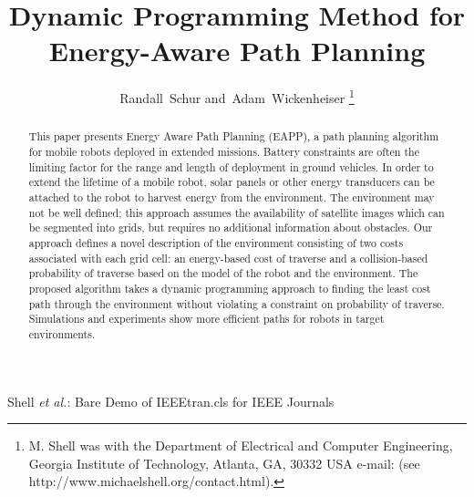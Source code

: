 \documentclass[journal]{IEEEtran}
\begin{document}
\title{Dynamic Programming Method for Energy-Aware Path Planning}

%

\author{Randall~Schur
        and~Adam~Wickenheiser
\thanks{M. Shell was with the Department
of Electrical and Computer Engineering, Georgia Institute of Technology, Atlanta,
GA, 30332 USA e-mail: (see http://www.michaelshell.org/contact.html).}%
}

%
{Shell \MakeLowercase{\textit{et al.}}: Bare Demo of IEEEtran.cls for IEEE Journals}

\maketitle

\begin{abstract}
This paper presents Energy Aware Path Planning (EAPP), a path planning algorithm for mobile robots deployed in extended missions. Battery constraints are often the limiting factor for the range and length of deployment in ground vehicles. In order to extend the lifetime of a mobile robot, solar panels or other energy transducers can be attached to the robot to harvest energy from the environment. The environment may not be well defined; this approach assumes the availability of satellite images which can be segmented into grids, but requires no additional information about obstacles. Our approach defines a novel description of the environment consisting of two costs associated with each grid cell: an energy-based cost of traverse and a collision-based probability of traverse based on the model of the robot and the environment. The proposed algorithm takes a dynamic programming approach to finding the least cost path through the environment without violating a constraint on probability of traverse. Simulations and experiments show more efficient paths for robots in target environments.
\end{abstract}
\end{document}
